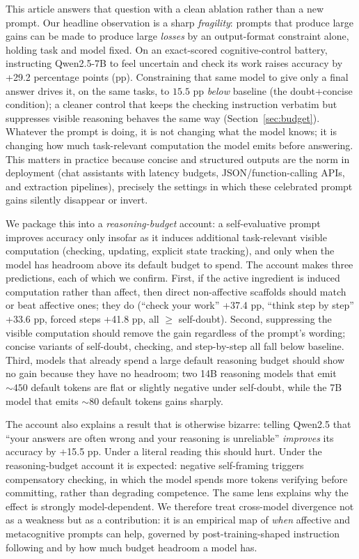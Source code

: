 \documentclass{article}
\begin{document}
This article answers that question with a clean ablation rather than a new prompt. Our headline observation is a sharp \emph{fragility}: prompts that produce large gains can be made to produce large \emph{losses} by an output-format constraint alone, holding task and model fixed. On an exact-scored cognitive-control battery, instructing Qwen2.5-7B to feel uncertain and check its work raises accuracy by +29.2 percentage points (pp). Constraining that same model to give only a final answer drives it, on the same tasks, to $15.5$ pp \emph{below} baseline (the doubt+concise condition); a cleaner control that keeps the checking instruction verbatim but suppresses visible reasoning behaves the same way (Section~\ref{sec:budget}). Whatever the prompt is doing, it is not changing what the model knows; it is changing how much task-relevant computation the model emits before answering. This matters in practice because concise and structured outputs are the norm in deployment (chat assistants with latency budgets, JSON/function-calling APIs, and extraction pipelines), precisely the settings in which these celebrated prompt gains silently disappear or invert.

We package this into a \textit{reasoning-budget} account: a self-evaluative prompt improves accuracy only insofar as it induces additional task-relevant visible computation (checking, updating, explicit state tracking), and only when the model has headroom above its default budget to spend. The account makes three predictions, each of which we confirm. First, if the active ingredient is induced computation rather than affect, then direct non-affective scaffolds should match or beat affective ones; they do (``check your work'' +37.4 pp, ``think step by step'' +33.6 pp, forced steps +41.8 pp, all $\geq$ self-doubt). Second, suppressing the visible computation should remove the gain regardless of the prompt's wording; concise variants of self-doubt, checking, and step-by-step all fall below baseline. Third, models that already spend a large default reasoning budget should show no gain because they have no headroom; two 14B reasoning models that emit ${\sim}450$ default tokens are flat or slightly negative under self-doubt, while the 7B model that emits ${\sim}80$ default tokens gains sharply.

The account also explains a result that is otherwise bizarre: telling Qwen2.5 that ``your answers are often wrong and your reasoning is unreliable'' \emph{improves} its accuracy by +15.5 pp. Under a literal reading this should hurt. Under the reasoning-budget account it is expected: negative self-framing triggers compensatory checking, in which the model spends more tokens verifying before committing, rather than degrading competence. The same lens explains why the effect is strongly model-dependent. We therefore treat cross-model divergence not as a weakness but as a contribution: it is an empirical map of \emph{when} affective and metacognitive prompts can help, governed by post-training-shaped instruction following and by how much budget headroom a model has.
\end{document}
